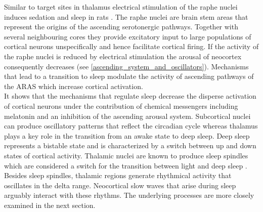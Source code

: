 Similar to target sites in thalamus electrical stimulation of the raphe nuclei induces sedation and sleep in rats \parencite{kostowski1969electrical}. The raphe nuclei are brain stem areas that represent the origins of the ascending serotonergic pathways. Together with several neighbouring cores they provide excitatory input to large populations of cortical neurons unspecifically and hence facilitate cortical firing. If the activity of the raphe nuclei is reduced by electrical stimulation the arousal of neocortex consequently decreases (see \ref{ascending_system_and_oscillators}). Mechanisms that lead to a transition to sleep modulate the activity of ascending pathways of the ARAS which increase cortical activation.\\
It shows that the mechanisms that regulate sleep decrease the disperse activation of cortical neurons under the contribution of chemical messengers including melatonin and an inhibition of the ascending arousal system. Subcortical nuclei can produce oscillatory patterns that reflect the circadian cycle whereas thalamus plays a key role in the transition from an awake state to deep sleep. Deep sleep represents a bistable state and is characterized by a switch between up and down states of cortical activity. Thalamic nuclei are known to produce sleep spindles which are considered a switch for the transition between light and deep sleep \parencite{montagna2005fatal}. Besides sleep spindles, thalamic regions generate rhythmical activity that oscillates in the delta range. Neocortical slow waves that arise during sleep arguably interact with these rhythms. The underlying processes are more closely examined in the next section.
